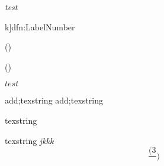 \begin{itemize}
\end{itemize}

\textit{test}

\begin{dfn}k]{dfn:Label}{Number}
\end{dfn}

()


()


\texorpdfstring{$test$}{word}

add;texstring
add;texstring





texstring

texstring
\textit{jkkk}
\[\frac{(3}{})\]

